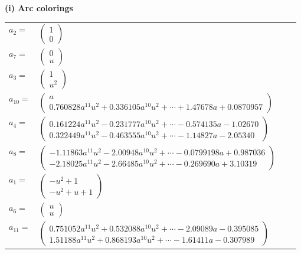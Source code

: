 \documentclass[1p]{elsarticle_modified}
\theoremstyle{definition}
\begin{document}
\flushleft \textbf{(i) Arc colorings}\\
\begin{tabular}{m{7pt} m{180pt} m{7pt} m{180pt} }
\flushright $a_{2}=$&$\begin{pmatrix}1\\0\end{pmatrix}$ \\
\flushright $a_{7}=$&$\begin{pmatrix}0\\u\end{pmatrix}$ \\
\flushright $a_{3}=$&$\begin{pmatrix}1\\u^2\end{pmatrix}$ \\
\flushright $a_{10}=$&$\begin{pmatrix}a\\0.760828 a^{11} u^{2}+0.336105 a^{10} u^{2}+\cdots+1.47678 a+0.0870957\end{pmatrix}$ \\
\flushright $a_{4}=$&$\begin{pmatrix}0.161224 a^{11} u^{2}-0.231777 a^{10} u^{2}+\cdots-0.574135 a-1.02670\\0.322449 a^{11} u^{2}-0.463555 a^{10} u^{2}+\cdots-1.14827 a-2.05340\end{pmatrix}$ \\
\flushright $a_{8}=$&$\begin{pmatrix}-1.11863 a^{11} u^{2}-2.00948 a^{10} u^{2}+\cdots-0.0799198 a+0.987036\\-2.18025 a^{11} u^{2}-2.66485 a^{10} u^{2}+\cdots-0.269690 a+3.10319\end{pmatrix}$ \\
\flushright $a_{1}=$&$\begin{pmatrix}- u^2+1\\- u^2+u+1\end{pmatrix}$ \\
\flushright $a_{6}=$&$\begin{pmatrix}u\\u\end{pmatrix}$ \\
\flushright $a_{11}=$&$\begin{pmatrix}0.751052 a^{11} u^{2}+0.532088 a^{10} u^{2}+\cdots-2.09089 a-0.395085\\1.51188 a^{11} u^{2}+0.868193 a^{10} u^{2}+\cdots-1.61411 a-0.307989\end{pmatrix}$ \\

\end{tabular}
\end{document}
